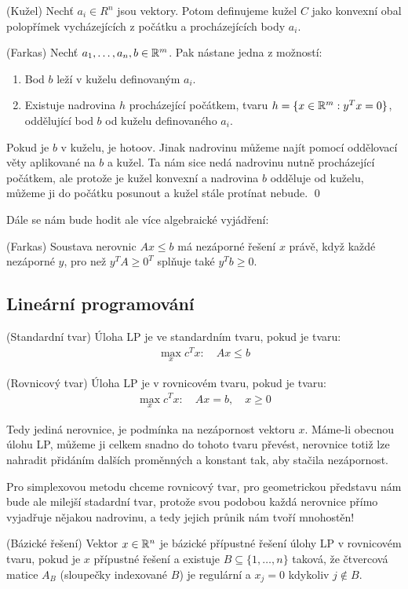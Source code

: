 \df (Kužel) Nechť $a_i\in R^n$ jsou vektory. Potom definujeme kužel $C$ jako
konvexní obal polopřímek vycházejících z počátku a procházejících body $a_i$.

\lm (Farkas) Nechť $a_1, \dots, a_n, b \in \mathbb{R}^m$. Pak nástane jedna z možností:
\begin{enumerate}
	\item Bod $b$ leží v kuželu definovaným $a_i$.
	\item Existuje nadrovina $h$ procházející počátkem, tvaru $h = \{x \in \mathbb{R}^m
	: y^Tx = 0\}$, oddělující bod $b$ od kuželu definovaného $a_i$.
\end{enumerate}
\dk Pokud je $b$ v kuželu, je hotoov. Jinak nadrovinu můžeme najít pomocí
oddělovací věty aplikované na $b$ a kužel. Ta nám sice nedá nadrovinu nutně
procházející počátkem, ale protože je kužel konvexní a nadrovina $b$ odděluje
od kuželu, můžeme ji do počátku posunout a kužel stále protínat nebude. \qed

Dále se nám bude hodit ale více algebraické vyjádření:

\lm (Farkas) Soustava nerovnic $Ax \leq b$ má nezáporné řešení $x$ právě, když
každé nezáporné $y$, pro než $y^TA \geq 0^T$ splňuje také $y^Tb \geq 0$.

\subsection{Lineární programování}

\df (Standardní tvar) Úloha LP je ve standardním tvaru, pokud je tvaru:
\begin{align}
	\max_x c^Tx : \quad Ax \leq b
\end{align}

\df (Rovnicový tvar) Úloha LP je v rovnicovém tvaru, pokud je tvaru:
\begin{align}
	\max_x c^Tx : \quad Ax = b, \quad x \geq 0
\end{align}

Tedy jediná nerovnice, je podmínka na nezápornost vektoru $x$. Máme-li obecnou
úlohu LP, můžeme ji celkem snadno do tohoto tvaru převést, nerovnice totiž lze
nahradit přidáním dalších proměnných a konstant tak, aby stačila nezápornost.

Pro simplexovou metodu chceme rovnicový tvar, pro geometrickou představu nám
bude ale milejší stadardní tvar, protože svou podobou každá nerovnice přímo
vyjadřuje nějakou nadrovinu, a tedy jejich průnik nám tvoří mnohostěn!

\df (Bázické řešení) Vektor $x \in \mathbb{R}^n$ je bázické přípustné řešení úlohy LP v
rovnicovém tvaru, pokud je $x$ přípustné řešení a existuje $B \subseteq \{1,
\dots, n\}$ taková, že čtvercová matice $A_B$ (sloupečky indexované $B$) je
regulární a $x_j = 0$ kdykoliv $j \notin B$.

